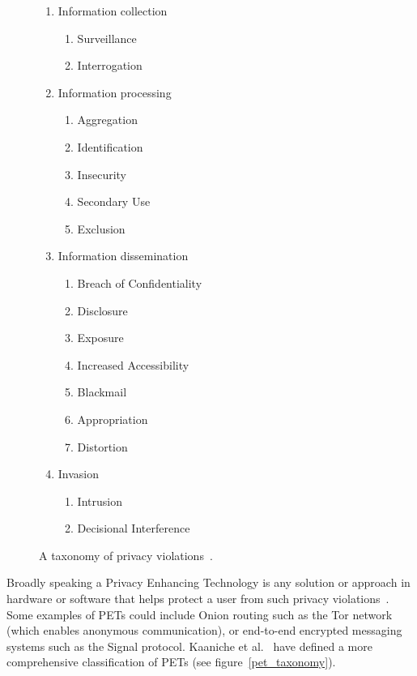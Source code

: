 \documentclass[
    author={Jacob Daniel Halsey},
    supervisor={Prof. Awais Rashid},
    degree={BSc},
    title={Building a Testbed for Evaluating Privacy Enhancing Technologies  (PETs)},
    subtitle={},
    type={software development},
    year={2021}
]{dissertation}
\begin{document}
\begin{figure}
	\centering
	\parbox{7cm}{
		\begin{enumerate}
			\item Information collection
			\begin{enumerate}
				\item Surveillance
				\item Interrogation 
			\end{enumerate}
			\item Information processing
			\begin{enumerate}
				\item Aggregation
				\item Identification
				\item Insecurity
				\item Secondary Use
				\item Exclusion
			\end{enumerate}
		\end{enumerate}
	}
	\qquad
	\begin{minipage}{7cm}
		\begin{enumerate}
			\setcounter{enumi}{2}
			\item Information  dissemination
			\begin{enumerate}
				\item Breach of Confidentiality
				\item Disclosure
				\item Exposure
				\item Increased Accessibility
				\item Blackmail
				\item Appropriation
				\item Distortion
			\end{enumerate}
			\item Invasion
			\begin{enumerate}
				\item Intrusion
				\item Decisional Interference
			\end{enumerate} 
		\end{enumerate}
	\end{minipage}
	\caption{A taxonomy of privacy violations~\cite{solove_privacy}.}
	\label{privacy_taxonomy}
\end{figure}

Broadly speaking a Privacy Enhancing Technology is any solution or approach in hardware or software that helps
protect a user from such privacy violations~\cite{buckley_pets}. Some examples of PETs could include 
Onion routing such as the Tor network (which enables anonymous communication), or
end-to-end encrypted messaging systems such as the Signal protocol. 
Kaaniche et al.~\cite{kaaniche_2020_privacy} have defined a more comprehensive classification of PETs
(see figure~\ref{pet_taxonomy}).
\end{document}
